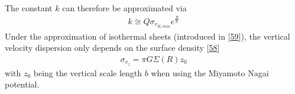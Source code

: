 \documentclass[letterpaper,10pt,english]{sphinxmanual}
\begin{document}
\sphinxAtStartPar
The constant \(k\) can therefore be approximated via
\begin{equation}\label{equation:NBodySimulation/Initialization:radial_velocity_dispersion_constant}
\begin{split}k \cong Q \sigma_{v_{R,min}}e^{\frac{R}{h}}\end{split}
\end{equation}
\sphinxAtStartPar
Under the approximation of isothermal sheets (introduced in {[}\hyperlink{cite.NBodySimulation/Appendix:id14}{59}{]}), the vertical velocity dispersion only depends on the surface density {[}\hyperlink{cite.NBodySimulation/Appendix:id15}{58}{]}
\begin{equation}\label{equation:NBodySimulation/Initialization:vertical_velocity_dispersion}
\begin{split}\sigma_{v_{z}} = \pi G \Sigma \left ( R \right )z_{0}\end{split}
\end{equation}
\sphinxAtStartPar
with \(z_{0}\) being the vertical scale length \(b\) when using the Miyamoto Nagai potential.
\end{document}
